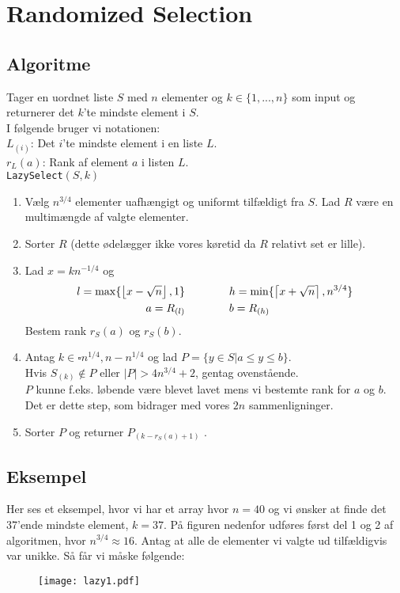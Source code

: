 \section{Randomized Selection}
\subsection{Algoritme}
Tager en uordnet liste $S$ med $n$ elementer og $k \in \{1, ..., n\}$ som input og returnerer det $k$'te mindste element i $S$.\\

I følgende bruger vi notationen:\\
$L_{(i)}$: Det $i$'te mindste element i en liste $L$.\\
$r_L(a)$: Rank af element $a$ i listen $L$.\\


\texttt{LazySelect}$(S, k)$
\begin{enumerate}
  \item Vælg $n^{3/4}$ elementer uafhængigt og uniformt tilfældigt fra $S$. Lad $R$ være en multimængde af valgte elementer.
  \item Sorter $R$ (dette ødelægger ikke vores køretid da $R$ relativt set er lille).
  \item Lad $x = kn^{-1/4}$ og
  \begin{align*}
    l = \max\{\left\lfloor x - \sqrt{n} \right\rfloor, 1\}
    \quad\quad & \quad\quad
    h = \min\{\left\lceil x + \sqrt{n} \right\rceil, n^{3/4} \} \\
    a = R_{(l)}
    \quad\quad & \quad\quad
    b = R_{(h)}
  \end{align*}
  Bestem rank $r_S(a)$ og $r_S(b)$.
  \item Antag $k \in \square{ n^{1/4}, n-n^{1/4} }$ og lad $P = \{ y \in S | a \leq y \leq b \}$.\\
  Hvis $S_{(k)} \notin P$ eller $|P| > 4n^{3/4}+2$, gentag ovenstående.\\

  $P$ kunne f.eks. løbende være blevet lavet mens vi bestemte rank for $a$ og $b$. Det er dette step, som bidrager med vores $2n$ sammenligninger.
  \item Sorter $P$ og returner $P_{(k - r_S(a) + 1)}$ .
\end{enumerate}

\subsection{Eksempel}
Her ses et eksempel, hvor vi har et array hvor $n = 40$ og vi ønsker at finde det 37'ende mindste element, $k = 37$. På figuren nedenfor udføres først del 1 og 2 af algoritmen, hvor $n^{3/4} \approx 16$. Antag at alle de elementer vi valgte ud tilfældigvis var unikke. Så får vi måske følgende:
\begin{figure}[H]
  \begin{center}
  \texttt{[image: lazy1.pdf]}
  \end{center}
  \label{fig:lazy1}
\end{figure}

